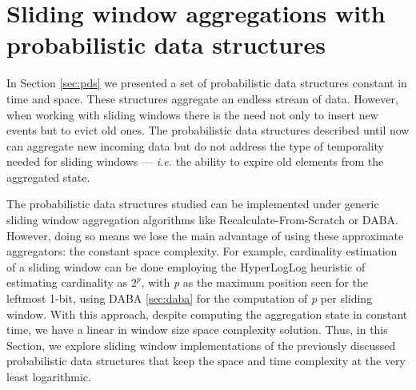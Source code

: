 \section{Sliding window aggregations with probabilistic data structures} \label{sec:sliding-pds}
In Section \ref{sec:pds} we presented a set of probabilistic data structures constant in time and space. These structures aggregate an endless stream of data. However, when working with sliding windows there is the need not only to insert new events but to evict old ones. The probabilistic data structures described until now can aggregate new incoming data but do not address the type of temporality needed for sliding windows --- \textit{i.e.} the ability to expire old elements from the aggregated state.

The probabilistic data structures studied can be implemented under generic sliding window aggregation algorithms like Recalculate-From-Scratch or DABA. However, doing so means we lose the main advantage of using these approximate aggregators: the constant space complexity. For example, cardinality estimation of a sliding window can be done employing the HyperLogLog heuristic of estimating cardinality as $2^\textit{p}$, with \textit{p} as the maximum position seen for the leftmost 1-bit, using DABA \ref{sec:daba} for the computation of \textit{p} per sliding window. With this approach, despite computing the aggregation state in constant time, we have a linear in window size space complexity solution. Thus, in this Section, we explore sliding window implementations of the previously discussed probabilistic data structures that keep the space and time complexity at the very least logarithmic.


